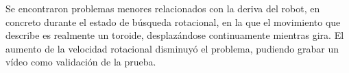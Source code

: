 Se encontraron problemas menores relacionados con la deriva del robot, en concreto durante el estado de búsqueda rotacional, en la que el movimiento que describe es realmente un toroide, desplazándose continuamente mientras gira. El aumento de la velocidad rotacional disminuyó el problema, pudiendo grabar un vídeo como validación de la prueba.

\begin{figure}[H]
	\begin{center}
		\centering
		\hspace{5mm}
		\hspace{5mm}
		\label{fig:navegacionReal1}	
	\end{center}
\end{figure}

